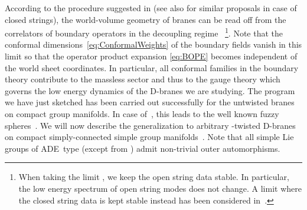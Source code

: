 \documentclass[12pt,a4paper]{article}
\begin{document}
According to the procedure suggested in \cite{Schomerus:1999ug,
Alekseev:1999bs} (see also \cite{Frohlich:1993es,
Frohlich:1995mr} 
for similar proposals in case of closed strings), the world-volume 
geometry of branes can be read off from the correlators of boundary 
operators in the decoupling regime~\coordHE{}
\footnote{When taking the limit \coordHE{}, we keep the open string
data stable. In particular, the low energy spectrum of open string modes
does not change. A limit where the closed string data is kept stable
instead has been considered in~\cite{Felder:1999ka}.}. Note that 
the conformal dimensions~\eqref{eq:ConformalWeights} of the boundary 
fields vanish in this limit so that the operator product expansion
\eqref{eq:BOPE} becomes independent of the world sheet coordinates.
In particular, all conformal families in the boundary theory contribute 
to the massless sector and thus to the gauge theory which governs the 
low energy dynamics of the D-branes we are studying. The program we 
have just sketched has been carried out successfully for the 
untwisted branes on compact group manifolds. In case of~\coordHE{}, 
this leads to the well known fuzzy spheres~\cite{Madore:1992bw, 
Alekseev:1999bs}. We will now describe the generalization to 
arbitrary \myHighlight{$\omega$}\coordHE{}-twisted D-branes on compact simply-connected
simple group manifolds~\coordHE{}. Note that all simple Lie groups of 
ADE~type (except from \coordHE{}) admit non-trivial outer automorphisms.
\end{document}
